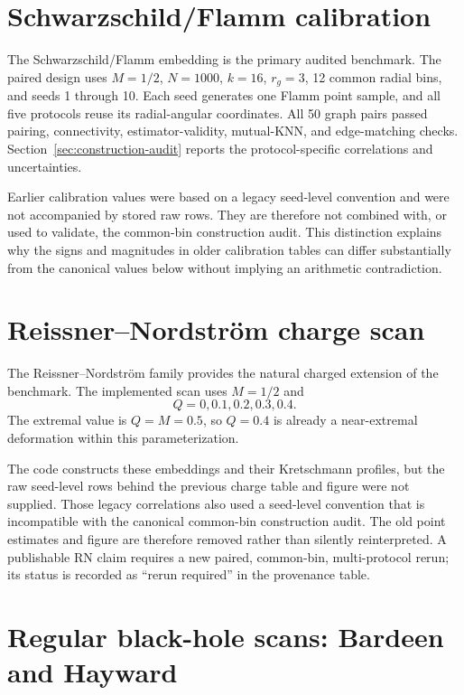 \documentclass[11pt,a4paper]{article}
\begin{document}
\section{Schwarzschild/Flamm calibration}
\label{sec:results-schwarzschild}

The Schwarzschild/Flamm embedding is the primary audited benchmark. The paired design uses $M=1/2$, $N=1000$, $k=16$, $r_g=3$, 12 common radial bins, and seeds 1 through 10. Each seed generates one Flamm point sample, and all five protocols reuse its radial-angular coordinates. All 50 graph pairs passed pairing, connectivity, estimator-validity, mutual-KNN, and edge-matching checks. Section~\ref{sec:construction-audit} reports the protocol-specific correlations and uncertainties.

Earlier calibration values were based on a legacy seed-level convention and were not accompanied by stored raw rows. They are therefore not combined with, or used to validate, the common-bin construction audit. This distinction explains why the signs and magnitudes in older calibration tables can differ substantially from the canonical values below without implying an arithmetic contradiction.

\section{Reissner--Nordstr\"om charge scan}
\label{sec:results-rn}

The Reissner--Nordstr\"om family provides the natural charged extension of the benchmark. The implemented scan uses $M=1/2$ and
\begin{equation}
    Q=0,0.1,0.2,0.3,0.4.
\end{equation}
The extremal value is $Q=M=0.5$, so $Q=0.4$ is already a near-extremal deformation within this parameterization.

The code constructs these embeddings and their Kretschmann profiles, but the raw seed-level rows behind the previous charge table and figure were not supplied. Those legacy correlations also used a seed-level convention that is incompatible with the canonical common-bin construction audit. The old point estimates and figure are therefore removed rather than silently reinterpreted. A publishable RN claim requires a new paired, common-bin, multi-protocol rerun; its status is recorded as ``rerun required'' in the provenance table.

\section{Regular black-hole scans: Bardeen and Hayward}
\label{sec:results-regular}
\end{document}
